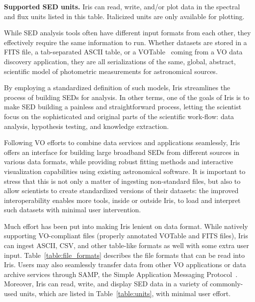 \documentclass[preprint,authoryear,5p]{elsarticle}
\begin{document}
\begin{table}[h!]
\caption{\textbf{Supported SED units.} Iris can read, write, and/or plot data in
the spectral and flux units listed in this table. Italicized units are only available
for plotting.}
\label{table:units}

\end{table}

While SED analysis tools often have different input formats from each other,
they effectively require the same information to run. Whether datasets are
stored in a FITS file, a tab-separated ASCII table, or a 
VOTable~\citep{2011arXiv1110.0524O} coming from a
VO data discovery application, they are all serializations of the same, global,
abstract, scientific model of photometric measurements for
astronomical sources.

By employing a standardized definition of such models, Iris streamlines
the process of building SEDs for analysis. In other terms, one of the goals of
Iris is to make SED building a painless and straightforward process, letting the
scientist focus on the sophisticated and original parts of the scientific
work-flow: data analysis, hypothesis testing, and knowledge extraction.

Following VO efforts to combine data services and applications seamlessly, Iris
offers an interface for building large broadband SEDs from different sources in
various data formats, while providing robust fitting methods and interactive
visualization capabilities using existing astronomical software.
It is important to stress that this is not only a matter of ingesting
non-standard files, but also to allow scientists to create standardized versions
of their datasets: the improved interoperability enables more tools, inside or
outside Iris, to load and interpret such datasets with minimal user
intervention.

\begin{sloppypar}
Much effort has been put into making Iris lenient on data format. While natively
supporting VO-compliant files (properly annotated
VOTable and FITS files), Iris can ingest ASCII, CSV,
and other table-like formats as well with some extra user input.
Table~\ref{table:file_formats}
describes the file formats that can be read into Iris. Users may also
seamlessly transfer data from other VO applications or data archive services
through SAMP, the Simple Application Messaging
Protocol~\citep{2011arXiv1110.0528T}. Moreover, Iris can read, write, and display SED data in
a variety of commonly-used units, which are listed in Table~\ref{table:units}, with minimal user effort.

\end{sloppypar}
\end{document}
